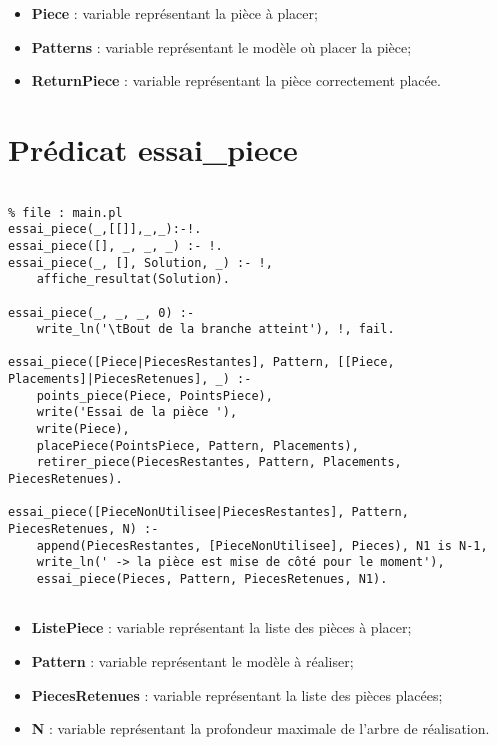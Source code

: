 \documentclass[a4paper, 11pt]{report}
\begin{document}
\begin{appendices}
\begin{verbatim}
    \end{verbatim}

    \begin{itemize}
        \item \textbf{Piece} : variable représentant la pièce à placer;
        \item \textbf{Patterns} : variable représentant le modèle où placer la pièce;
        \item \textbf{ReturnPiece} : variable représentant la pièce correctement placée.
    \end{itemize}


\chapter{Prédicat essai_piece}
    \begin{verbatim}

% file : main.pl
essai_piece(_,[[]],_,_):-!.
essai_piece([], _, _, _) :- !.
essai_piece(_, [], Solution, _) :- !, 
    affiche_resultat(Solution).

essai_piece(_, _, _, 0) :- 
    write_ln('\tBout de la branche atteint'), !, fail.

essai_piece([Piece|PiecesRestantes], Pattern, [[Piece, Placements]|PiecesRetenues], _) :-
    points_piece(Piece, PointsPiece),
    write('Essai de la pièce '),
    write(Piece),
    placePiece(PointsPiece, Pattern, Placements),
    retirer_piece(PiecesRestantes, Pattern, Placements, PiecesRetenues).

essai_piece([PieceNonUtilisee|PiecesRestantes], Pattern, PiecesRetenues, N) :- 
    append(PiecesRestantes, [PieceNonUtilisee], Pieces), N1 is N-1,
    write_ln(' -> la pièce est mise de côté pour le moment'),
    essai_piece(Pieces, Pattern, PiecesRetenues, N1).  
    
    \end{verbatim}

    \begin{itemize}
        \item \textbf{ListePiece} : variable représentant la liste des pièces à placer;
        \item \textbf{Pattern} : variable représentant le modèle à réaliser;
        \item \textbf{PiecesRetenues} : variable représentant la liste des pièces placées;
        \item \textbf{N} : variable représentant la profondeur maximale de l'arbre de réalisation.
    \end{itemize}




\end{appendices} 
\end{document}
